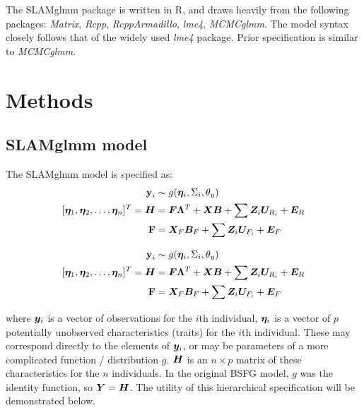 \documentclass[11pt]{amsart}
\newcommand*{\B}[1]{\ifmmode\bm{#1}\else\textbf{#1}\fi}
\begin{document}
The SLAMglmm package is written in R, and draws heavily from the following packages: \emph{Matrix}, \emph{Rcpp}, \emph{RcppArmadillo}, \emph{lme4}, \emph{MCMCglmm}. The model syntax closely follows that of the widely used \emph{lme4} package. Prior specification is similar to \emph{MCMCglmm}.


\section{Methods}
\subsection{SLAMglmm model}
The SLAMglmm model is specified as:
\begin{align}
\label{effect_model}
\begin{split}
\B{y}_i &\sim g(\B{\eta}_i,\Sigma_{i},\theta_y) \\
[\B{\eta}_1, \B{\eta}_2, \dots, \B{\eta}_n]^T = \B{H} &=  \B{F}\B{\Lambda}^T + \B{X}\B{B} + \sum \B{Z}_i \B{U}_{R_i} + \B{E}_R \\
\B{F} &= \B{X}_F\B{B}_F + \sum \B{Z}_i \B{U}_{F_i} + \B{E}_F 
\end{split}
\end{align}

\begin{align}
\label{effect_mode2l}
\begin{split}
\B{y}_i &\sim g(\B{\eta}_i,\Sigma_{i},\theta_y) \\
[\B{\eta}_1, \B{\eta}_2, \dots, \B{\eta}_n]^T = \B{H} &=  \B{F}\B{\Lambda}^T + \B{X}\B{B} + \sum \B{Z}_i \B{U}_{R_i} + \B{E}_R \\
\B{F} &= \B{X}_F\B{B}_F + \sum \B{Z}_i \B{U}_{F_i} + \B{E}_F 
\end{split}
\end{align}

\noindent where $\B{y}_i$ is a vector of observations for the $i$th individual, $\B{\eta}_i$ is a vector of $p$ potentially unobserved characteristics (traits) for the $i$th individual. These may correspond directly to the elements of $\B{y}_i$, or may be parameters of a more complicated function / distribution $g$. $\B{H}$ is an $n \times p$ matrix of these characteristics for the $n$ individuals. In the original BSFG model, $g$ was the identity function, so $\B{Y} = \B{H}$. The utility of this hierarchical specification will be demonstrated below.
\end{document}
